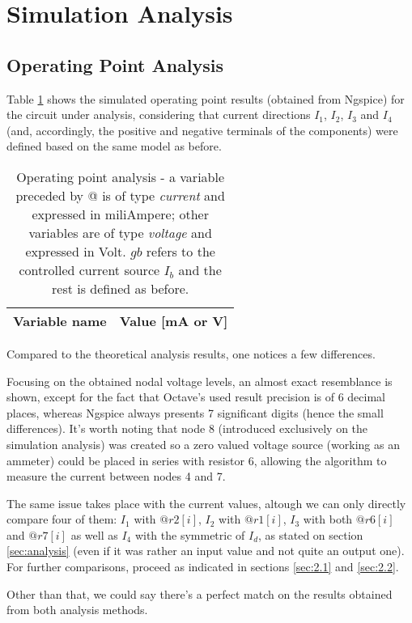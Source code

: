\section{Simulation Analysis}
\label{sec:simulation}
\captionsetup[table]{skip=10pt}

\subsection{Operating Point Analysis}

\vspace{5mm}
\par Table \ref{tab_op} shows the simulated operating point results (obtained from Ngspice) for the circuit under analysis, considering that current directions $I_1$, $I_2$, $I_3$ and $I_4$ (and, accordingly, the positive and negative terminals of the components) were defined based on the same model as before.


\renewcommand{\arraystretch}{1.5}
\begin{table}[h]
  \centering
  \begin{tabular}{|c|c|}
    \hline    
    \textbf{Variable name} & \textbf{Value [mA or V]} \\ \hline
    
  \end{tabular}
  \caption{Operating point analysis - a variable preceded by @ is of type \textit{current} and expressed in miliAmpere; other variables are of type \textit {voltage} and expressed in Volt. $gb$ refers to the controlled current source $I_b$ and the rest is defined as before.}
  \label{tab_op}
\end{table}
\vspace{3mm}
\par Compared to the theoretical analysis results, one notices a few differences.
\vspace{3mm}
\par Focusing on the obtained nodal voltage levels, an almost exact resemblance is shown, except for the fact that Octave's used result precision is of 6 decimal places, whereas Ngspice always presents 7 significant digits (hence the small differences). It's worth noting that node 8 (introduced exclusively on the simulation analysis) was created so a zero valued voltage source (working as an ammeter) could be placed in series with resistor 6, allowing the algorithm to measure the current between nodes 4 and 7.
\vspace{3mm}
\par The same issue takes place with the current values, altough we can only directly compare four of them: $I_1$ with $@r2[i]$, $I_2$ with $@r1[i]$, $I_3$ with both $@r6[i]$ and $@r7[i]$ as well as $I_4$ with the symmetric of $I_d$, as stated on section \ref{sec:analysis} (even if it was rather an input value and not quite an output one). For further comparisons, proceed as indicated in sections \ref{sec:2.1} and \ref{sec:2.2}.
\vspace{3mm}
\par Other than that, we could say there's a perfect match on the results obtained from both analysis methods.
\vspace{5mm}





